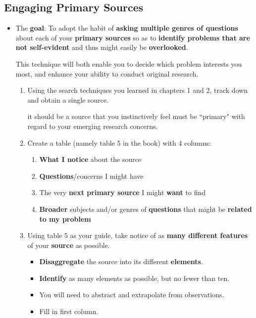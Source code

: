 \documentclass[11pt]{article}
\begin{document}
\subsection{Engaging Primary Sources}
\begin{itemize}
\item  \begin{exercise}

The \textbf{goal}: To adopt the habit of \textbf{asking multiple genres of questions} about each of your \textbf{primary sources} so as to \textbf{identify problems that are not self-evident} and thus might easily be \textbf{overlooked}. 

This technique will both enable you to decide which problem interests you most, and enhance your ability to conduct original research.

\begin{enumerate}
\item Using the search techniques you learned in chapters 1 and 2, track down and obtain a single source. 

it should be a source that you instinctively feel must be ``primary" with regard to your emerging research concerns.

\item Create a table (namely table 5 in the book) with 4 columns:
\begin{enumerate}
\item \textbf{What I notice} about the source 
\item \textbf{Questions}/concerns I might have
\item The very \textbf{next primary source} I might \textbf{want} to find
\item \textbf{Broader} subjects and/or genres of \textbf{questions} that might be \textbf{related to my problem}
\end{enumerate}

\item Using table 5 as your guide, take notice of as \textbf{many different features} of your \textbf{source} as possible. 
\begin{itemize}
\item \textbf{Disaggregate} the source into its different \textbf{elements}. 
\item  \textbf{Identify} as many elements as possible, but no fewer than ten.
\item  You will need to abstract and extrapolate from observations. 
\item Fill in first column.
\end{itemize}



\end{enumerate}
\end{exercise}
\end{itemize}
\end{document}
